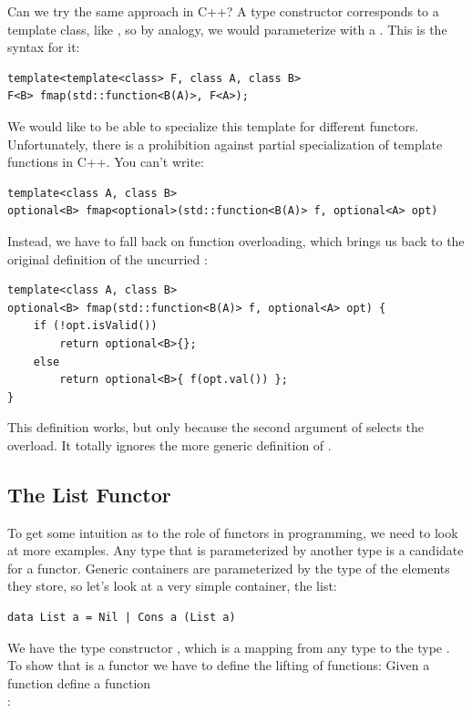 Can we try the same approach in C++? A type constructor corresponds to a
template class, like , so by analogy, we would
parameterize  with a 
. This is the syntax for it:

\begin{Verbatim}[commandchars=\\\{\}]
template<template<class> F, class A, class B>
F<B> fmap(std::function<B(A)>, F<A>);
\end{Verbatim}
We would like to be able to specialize this template for different
functors. Unfortunately, there is a prohibition against partial
specialization of template functions in C++. You can't write:

\begin{Verbatim}[commandchars=\\\{\}]
template<class A, class B>
optional<B> fmap<optional>(std::function<B(A)> f, optional<A> opt)
\end{Verbatim}
Instead, we have to fall back on function overloading, which brings us
back to the original definition of the uncurried :

\begin{Verbatim}[commandchars=\\\{\}]
template<class A, class B>
optional<B> fmap(std::function<B(A)> f, optional<A> opt) { 
    if (!opt.isValid()) 
        return optional<B>{}; 
    else
        return optional<B>{ f(opt.val()) };
}
\end{Verbatim}
This definition works, but only because the second argument of
 selects the overload. It totally ignores the more generic
definition of .

\subsection{The List Functor}\label{the-list-functor}

To get some intuition as to the role of functors in programming, we need
to look at more examples. Any type that is parameterized by another type
is a candidate for a functor. Generic containers are parameterized by
the type of the elements they store, so let's look at a very simple
container, the list:

\begin{Verbatim}[commandchars=\\\{\}]
data List a = Nil | Cons a (List a)
\end{Verbatim}
We have the type constructor , which is a mapping from any
type  to the type . To show that 
is a functor we have to define the lifting of functions: Given a
function  define a function\\
:

